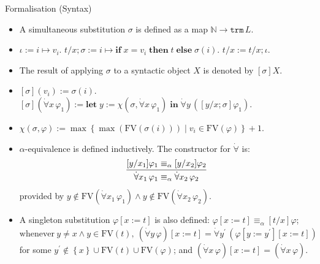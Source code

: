 \documentclass[serif,table,10pt]{beamer}
\newcommand{\IN}{\mathbb{N}}
\newcommand{\0}{\texttt{0}}
\newcommand{\1}{\texttt{1}}
\newcommand{\FV}{\mathrm{FV}}
\newcommand{\Lall}[1]{\dot{\forall}#1\,}
\begin{document}
\begin{frame}{Formalisation (Syntax)}

    \begin{itemize}
        \item A simultaneous substitution $\sigma$ is defined as a map $\IN \to \mathtt{trm} \, L$.
        \item $ \iota := i \mapsto  v_i $. $ t / x ; \sigma := i \mapsto \mathbf{if} \; x = v_i \; \mathbf{then} \; t \; \mathbf{else} \; \sigma ( i ) $. $ t / x := t / x ; \iota $.
        \item<2-> The result of applying $\sigma$ to a syntactic object $X$ is denoted by $[ \sigma ] X$.
        \item<2-> $[ \sigma ] ( v_i ) := \sigma ( i ) $. $[ \sigma ] ( \Lall{ x } \varphi_1 ) := \mathbf{let} \; y := \chi ( \sigma , \Lall{ x } \varphi_1 ) \; \mathbf{in} \; \Lall{y} ([ y / x ; \sigma ] \varphi_1) $.
        \item<2-> $ \chi ( \sigma , \varphi ) := \max \left\{ \max ( \FV ( \sigma ( i ) ) ) \mid v_i \in \FV ( \varphi ) \right\} + 1$.
        \item<3-> $\alpha$-equivalence is defined inductively. The constructor for $\dot\forall$ is: \[ \infer{\Lall{x_1} \varphi_1 \equiv_\alpha \Lall{x_2} \varphi_2}{[y / x_1] \varphi_1 \equiv_\alpha [y / x_2] \varphi_2} \] provided by $y \notin \FV ( \Lall{x_1} \varphi_1 ) \land y \notin \FV ( \Lall{x_2} \varphi_2 ) $.
        \item<4-> A singleton substitution $ \varphi [ x := t ] $ is also defined: $ \varphi[x := t] \equiv_\alpha [t / x] \varphi $;
        \[ \mathrm{whenever} \  y \ne x \land y \in \FV ( t ) , \  ( \Lall{y} \varphi ) [ x := t ] = \Lall{ y^\prime } ( \varphi [ y := y^\prime ][ x := t ] ) \] for some $y^\prime \notin \left\{ x \right\} \cup \FV ( t ) \cup \FV ( \varphi ) $; and $ ( \Lall{x} \varphi) [x := t] = (\Lall{x} \varphi) $.
    \end{itemize}

\end{frame}
\end{document}
